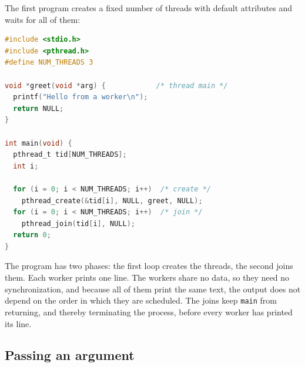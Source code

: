 \documentclass[../main.tex]{subfiles}
\begin{document}
The first program creates a fixed number of threads with default
attributes and waits for all of them:
\begin{lstlisting}[language=C, numbers=none]
#include <stdio.h>
#include <pthread.h>
#define NUM_THREADS 3

void *greet(void *arg) {            /* thread main */
  printf("Hello from a worker\n");
  return NULL;
}

int main(void) {
  pthread_t tid[NUM_THREADS];
  int i;

  for (i = 0; i < NUM_THREADS; i++)  /* create */
    pthread_create(&tid[i], NULL, greet, NULL);
  for (i = 0; i < NUM_THREADS; i++)  /* join */
    pthread_join(tid[i], NULL);
  return 0;
}
\end{lstlisting}
The program has two phases: the first loop creates the threads, the second
joins them.  Each worker prints one line.  The workers share no data, so
they need no synchronization, and because all of them print the same text,
the output does not depend on the order in which they are scheduled.  The
joins keep \texttt{main} from returning, and thereby terminating the
process, before every worker has printed its line.

\subsection{Passing an argument}
\end{document}
